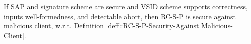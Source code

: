%  
%     
%     
   




\begin{lemma}\label{lem::RC-S-P-Security-Against Malicious-Client}
 If SAP and signature scheme are secure and  VSID scheme supports correctness, inputs well-formedness, and detectable abort, then RC-S-P is secure against malicious client, w.r.t. Definition \ref{deff::RC-S-P-Security-Against Malicious-Client}. 
\end{lemma}


